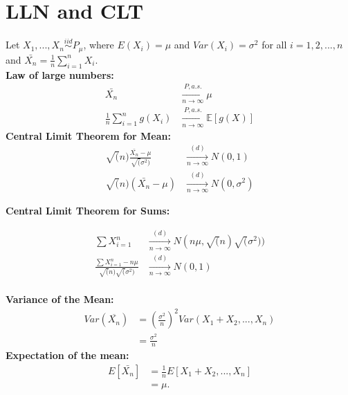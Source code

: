 \section{LLN and CLT}
Let $X_1, ..., X_n \stackrel{iid}{\sim} P_{\mu}$, where $E(X_i)=\mu$ and $Var(X_i)=\sigma^2$ for all $i=1,2,...,n$ and $\bar{X_n}= \frac{1}{n} \sum_{i=1}^{n} X_i$.\\
\textbf{Law of large numbers:}
\begin{align*}
\bar{X_n}& \xrightarrow[n \rightarrow \infty]{P, a.s.} \mu\\
\frac{1}{n} \sum_{i=1}^{n} g(X_i)& \xrightarrow[n \rightarrow \infty]{P, a.s.} \mathbb{E}[g(X)]
\end{align*}
\textbf{Central Limit Theorem for Mean:}
\begin{align*}
\sqrt(n)\frac{\bar{X_n}-\mu}{\sqrt(\sigma^2)}& \xrightarrow[n \rightarrow \infty]{(d)} N(0,1)\\
\sqrt(n)(\bar{X_n}-\mu)& \xrightarrow[n \rightarrow \infty]{(d)} N(0,\sigma^2)
\end{align*}

\textbf{Central Limit Theorem for Sums:}

\begin{align*}
\sum{X}_{i=1}^{n} & \xrightarrow[n \rightarrow \infty]{(d)} N(n \mu, \sqrt(n)\sqrt(\sigma^2))\\
\frac{\sum{X}_{i=1}^{n} - n\mu}{\sqrt(n) \sqrt(\sigma^2)} & \xrightarrow[n \rightarrow \infty]{(d)} N(0, 1)\\
\end{align*}

\textbf{Variance of the Mean:}
\begin{align*}
Var(\overline{X_n})&=(\frac{\sigma^2}{n})^2 Var(X_1 + X_2,...,X_n)\\
& =\frac{\sigma^2}{n}
\end{align*}
\textbf{Expectation of the mean:}
\begin{align*}
E[\bar{X_n}] & =\frac{1}{n}E[X_1 + X_2,...,X_n]\\
&=\mu.
\end{align*}